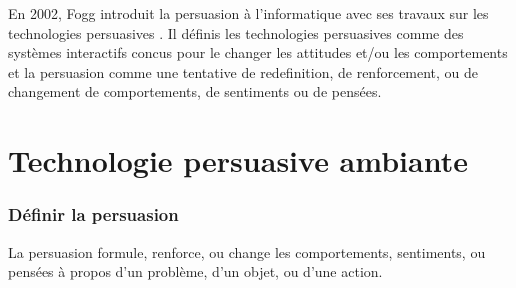\documentclass[]{pandoc/sigchi}
\begin{document}
En 2002, Fogg introduit la persuasion à l'informatique avec ses travaux
sur les technologies persuasives \citep{fogg2002persuasive}. Il définis
les technologies persuasives comme des systèmes interactifs concus pour
le changer les attitudes et/ou les comportements et la persuasion comme
une tentative de redefinition, de renforcement, ou de changement de
comportements, de sentiments ou de pensées.

\chapter{Technologie persuasive
ambiante}\label{technologie-persuasive-ambiante}

\subsection{Définir la persuasion}\label{duxe9finir-la-persuasion}

La persuasion formule, renforce, ou change les comportements,
sentiments, ou pensées à propos d'un problème, d'un objet, ou d'une
action. \citep{fogg2002persuasive}

\balance{}

\renewcommand\refname{Références}

\end{document}
